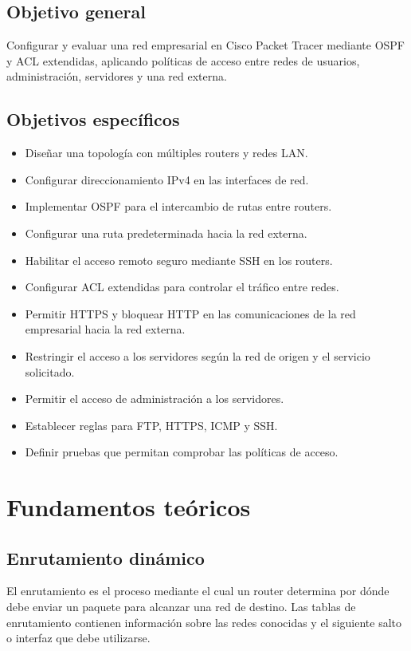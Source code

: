 \documentclass[12pt,a4paper]{article}
\begin{document}
\subsection{Objetivo general}

Configurar y evaluar una red empresarial en Cisco Packet Tracer
mediante OSPF y ACL extendidas, aplicando políticas de acceso
entre redes de usuarios, administración, servidores y una red externa.

\subsection{Objetivos específicos}

\begin{itemize}
    \item Diseñar una topología con múltiples routers y redes LAN.
    \item Configurar direccionamiento IPv4 en las interfaces de red.
    \item Implementar OSPF para el intercambio de rutas entre routers.
    \item Configurar una ruta predeterminada hacia la red externa.
    \item Habilitar el acceso remoto seguro mediante SSH en los routers.
    \item Configurar ACL extendidas para controlar el tráfico entre redes.
    \item Permitir HTTPS y bloquear HTTP en las comunicaciones
    de la red empresarial hacia la red externa.
    \item Restringir el acceso a los servidores según la red de origen
    y el servicio solicitado.
    \item Permitir el acceso de administración a los servidores.
    \item Establecer reglas para FTP, HTTPS, ICMP y SSH.
    \item Definir pruebas que permitan comprobar las políticas de acceso.
\end{itemize}

\section{Fundamentos teóricos}

\subsection{Enrutamiento dinámico}

El enrutamiento es el proceso mediante el cual un router determina
por dónde debe enviar un paquete para alcanzar una red de destino.
Las tablas de enrutamiento contienen información sobre las redes
conocidas y el siguiente salto o interfaz que debe utilizarse.
\end{document}
